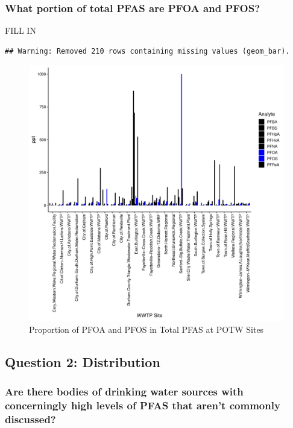 \documentclass[
  12pt,
]{article}
\begin{document}
\hypertarget{what-portion-of-total-pfas-are-pfoa-and-pfos}{%
\subsubsection{What portion of total PFAS are PFOA and
PFOS?}\label{what-portion-of-total-pfas-are-pfoa-and-pfos}}

FILL IN

\begin{verbatim}
## Warning: Removed 210 rows containing missing values (geom_bar).
\end{verbatim}

\begin{figure}

\includegraphics{PFAS_FinalProject_files/figure-latex/unnamed-chunk-23-1} \hfill{}

\caption{Proportion of PFOA and PFOS in Total PFAS at POTW Sites}\label{fig:unnamed-chunk-23}
\end{figure}

\hypertarget{question-2-distribution}{%
\subsection{Question 2: Distribution}\label{question-2-distribution}}

\hypertarget{are-there-bodies-of-drinking-water-sources-with-concerningly-high-levels-of-pfas-that-arent-commonly-discussed}{%
\subsubsection{Are there bodies of drinking water sources with
concerningly high levels of PFAS that aren't commonly
discussed?}\label{are-there-bodies-of-drinking-water-sources-with-concerningly-high-levels-of-pfas-that-arent-commonly-discussed}}
\end{document}
